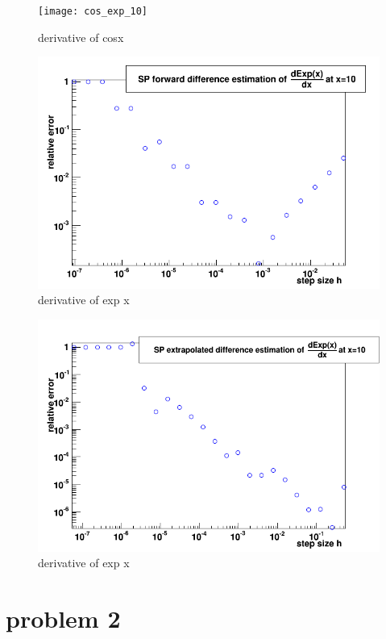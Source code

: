 \documentclass[%
aip,
 jmp,%
 amsmath,amssymb,
preprint,%
]{revtex4-1}
\begin{document}
\begin{figure}
\texttt{[image: cos\_exp\_10]} 
\caption{ derivative of cosx}
\label{sat}
\end{figure}

\begin{figure}
\includegraphics[scale=0.6]{exp_forward_10} 
\caption{ derivative of exp x}
\label{sat}
\end{figure}

\begin{figure}
\includegraphics[scale=0.6]{exp_extra_10} 
\caption{ derivative of exp x}
\label{sat}
\end{figure}

\section{problem 2}
\end{document}
